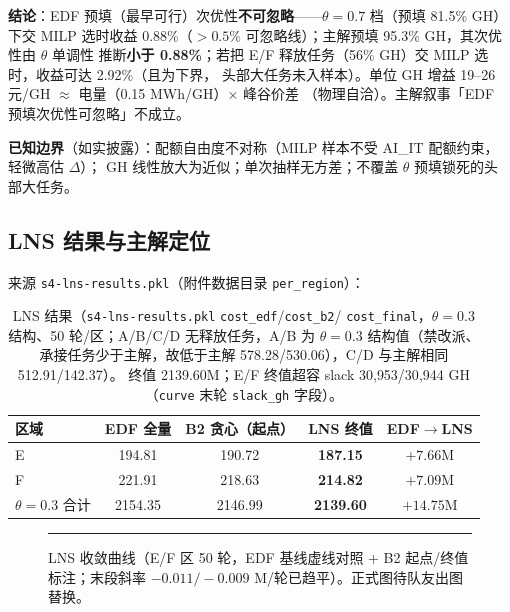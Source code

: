 \documentclass{internal-report}
\begin{document}
\textbf{结论}：EDF 预填（最早可行）次优性\textbf{不可忽略}——$\theta{=}0.7$ 档（预填 81.5\% GH）
下交 MILP 选时收益 0.88\%（$>0.5\%$ 可忽略线）；主解预填 95.3\% GH，其次优性由 $\theta$ 单调性
推断\textbf{小于 0.88\%}；若把 E/F 释放任务（56\% GH）交 MILP 选时，收益可达 2.92\%（且为下界，
头部大任务未入样本）。单位 GH 增益 19--26 元/GH $\approx$ 电量（0.15 MWh/GH）$\times$ 峰谷价差
（物理自洽）。主解叙事「EDF 预填次优性可忽略」不成立。

\textbf{已知边界}（如实披露）：配额自由度不对称（MILP 样本不受 AI\_IT 配额约束，轻微高估 $\Delta$）；
GH 线性放大为近似；单次抽样无方差；不覆盖 $\theta$ 预填锁死的头部大任务。

\subsection{LNS 结果与主解定位}
\label{sec:lns-result}

来源 \texttt{s4-lns-results.pkl}（附件数据目录 \texttt{per\_region}）：

\begin{table}[H]
\centering
\footnotesize
\begin{tabular}{lcccc}
\toprule
区域 & EDF 全量 & B2 贪心（起点） & \textbf{LNS 终值} & EDF$\to$LNS \\
\midrule
E & 194.81 & 190.72 & \textbf{187.15} & $+7.66$M \\
F & 221.91 & 218.63 & \textbf{214.82} & $+7.09$M \\
$\theta{=}0.3$ 合计 & 2154.35 & 2146.99 & \textbf{2139.60} & $+14.75$M \\
\bottomrule
\end{tabular}
\caption{LNS 结果（\texttt{s4-lns-results.pkl} \texttt{cost\_edf}/\texttt{cost\_b2}/
\texttt{cost\_final}，$\theta{=}0.3$ 结构、50 轮/区；A/B/C/D 无释放任务，A/B 为 $\theta{=}0.3$
结构值（禁改派、承接任务少于主解，故低于主解 578.28/530.06），C/D 与主解相同 512.91/142.37）。
终值 2139.60M；E/F 终值超容 slack 30{,}953/30{,}944 GH（\texttt{curve} 末轮
\texttt{slack\_gh} 字段）。}
\label{tab:lns}
\end{table}

\begin{figure}[H]
\centering
\rule{0.9\textwidth}{4cm}
\caption{LNS 收敛曲线（E/F 区 50 轮，EDF 基线虚线对照 + B2 起点/终值标注；末段斜率
$-0.011/-0.009$ M/轮已趋平）。正式图待队友出图替换。}
\label{fig:lnscurve}
\end{figure}
\end{document}
